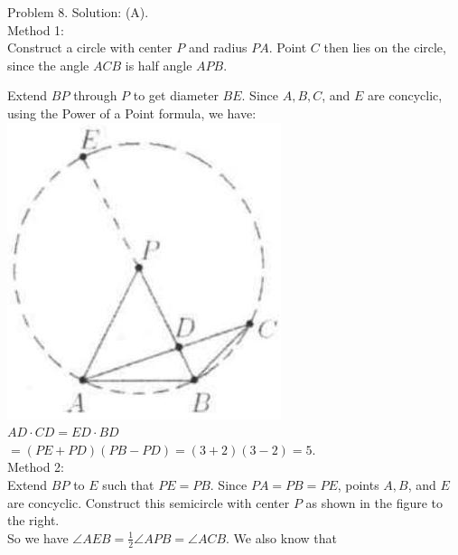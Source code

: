 \documentclass[10pt]{article}
\begin{document}
Problem 8. Solution: (A).\\
Method 1:\\
Construct a circle with center \(P\) and radius \(P A\). Point \(C\) then lies on the circle, since the angle \(A C B\) is half angle \(A P B\).

Extend \(B P\) through \(P\) to get diameter \(B E\). Since \(A, B, C\), and \(E\) are concyclic, using the Power of a Point formula, we have:\\
\includegraphics[max width=\textwidth, center]{2025_04_17_97bc1f7e44d93c271a88g-211(1)}\\
\(A D \cdot C D=E D \cdot B D\)\\
\(=(P E+P D)(P B-P D)=(3+2)(3-2)=5\).\\
Method 2:\\
Extend \(B P\) to \(E\) such that \(P E=P B\). Since \(P A=P B=P E\), points \(A, B\), and \(E\) are concyclic. Construct this semicircle with center \(P\) as shown in the figure to the right.\\
So we have \(\angle A E B=\frac{1}{2} \angle A P B=\angle A C B\). We also know that\\
\end{document}
